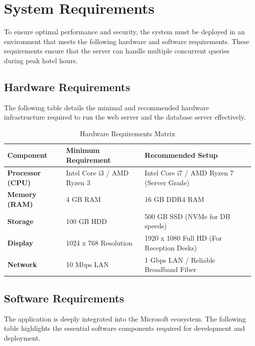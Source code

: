 \documentclass[12pt,a4paper]{article}
\begin{document}
\newpage
\section{System Requirements}
To ensure optimal performance and security, the system must be deployed in an environment that meets the following hardware and software requirements. These requirements ensure that the server can handle multiple concurrent queries during peak hotel hours.

\subsection{Hardware Requirements}
The following table details the minimal and recommended hardware infrastructure required to run the web server and the database server effectively.

\begin{table}[H]
\centering
\renewcommand{\arraystretch}{1.5}
\begin{tabularx}{\textwidth}{|l|X|X|}
\hline
\textbf{Component} & \textbf{Minimum Requirement} & \textbf{Recommended Setup} \\
\hline
\textbf{Processor (CPU)} & Intel Core i3 / AMD Ryzen 3 & Intel Core i7 / AMD Ryzen 7 (Server Grade) \\
\hline
\textbf{Memory (RAM)} & 4 GB RAM & 16 GB DDR4 RAM \\
\hline
\textbf{Storage} & 100 GB HDD & 500 GB SSD (NVMe for DB speeds) \\
\hline
\textbf{Display} & 1024 x 768 Resolution & 1920 x 1080 Full HD (For Reception Desks) \\
\hline
\textbf{Network} & 10 Mbps LAN & 1 Gbps LAN / Reliable Broadband Fiber \\
\hline
\end{tabularx}
\caption{Hardware Requirements Matrix}
\end{table}

\subsection{Software Requirements}
The application is deeply integrated into the Microsoft ecosystem. The following table highlights the essential software components required for development and deployment.
\end{document}

